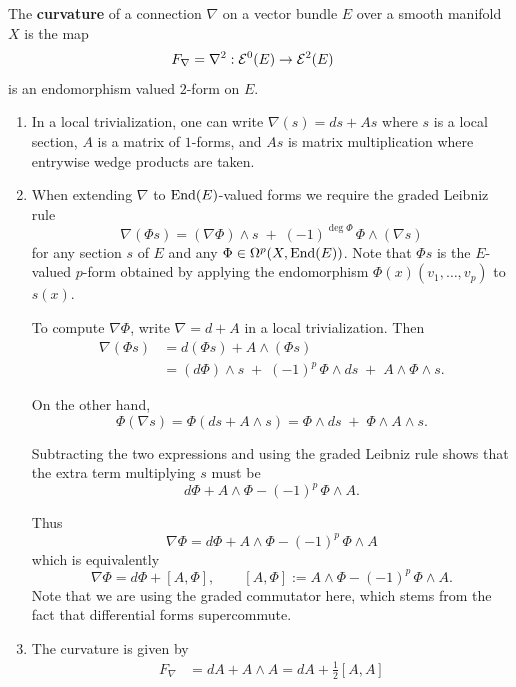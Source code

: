 \documentclass[12pt]{article}
\begin{document}
\begin{definition}
    The \textbf{curvature} of a connection $\nabla$ on a vector bundle $E$ over a smooth manifold $X$ is the map \begin{align*}
        F_\nabla & = \nabla^2: {\mathcal{E}}^0(E) \to {\mathcal{E}}^2(E)
    \end{align*} is an endomorphism valued $2$-form on $E$.
\end{definition}

\begin{enumerate}
    \item In a local trivialization, one can write $\nabla(s) = ds + As$ where $s$ is a local section, $A$ is a matrix of $1$-forms, and $As$ is matrix multiplication where entrywise wedge products are taken.

\item When extending $\nabla$ to $\operatorname{End}(E)$-valued forms we require the graded
Leibniz rule
\[
\nabla(\Phi s)
  = (\nabla\Phi)\wedge s \;+\; (-1)^{\deg\Phi}\,\Phi\wedge(\nabla s)
\]
for any section $s$ of $E$ and any $\Phi\in\Omega^p(X,\operatorname{End}(E))$.
Note that $\Phi s$ is the $E$-valued $p$-form obtained by applying the
endomorphism $\Phi(x)(v_1,\dots,v_p)$ to $s(x)$.

To compute $\nabla\Phi$, write $\nabla = d + A$ in a local trivialization.
Then
\[
\begin{aligned}
\nabla(\Phi s)
 &= d(\Phi s) + A\wedge(\Phi s) \\
 &= (d\Phi)\wedge s
     \;+\; (-1)^p\,\Phi\wedge ds
     \;+\; A\wedge\Phi\wedge s.
\end{aligned}
\]

On the other hand,
\[
\Phi(\nabla s)
 = \Phi(ds + A\wedge s)
 = \Phi\wedge ds \;+\; \Phi\wedge A\wedge s.
\]

Subtracting the two expressions and using the graded Leibniz rule shows
that the extra term multiplying $s$ must be
\[
d\Phi + A\wedge\Phi - (-1)^p\,\Phi\wedge A.
\]

Thus
\[
\boxed{\displaystyle
\nabla\Phi
  = d\Phi + A\wedge\Phi - (-1)^p\,\Phi\wedge A
}
\]
which is equivalently
\[
\nabla\Phi = d\Phi + [A,\Phi],
\qquad
[A,\Phi] := A\wedge\Phi - (-1)^p\,\Phi\wedge A.
\]
Note that we are using the graded commutator here, which stems from the fact that differential forms supercommute.

\item The curvature is given by \begin{align*}
    F_\nabla & = dA + A \wedge A = dA + \frac{1}{2}[A, A]
\end{align*} 
\end{enumerate}
\end{document}
